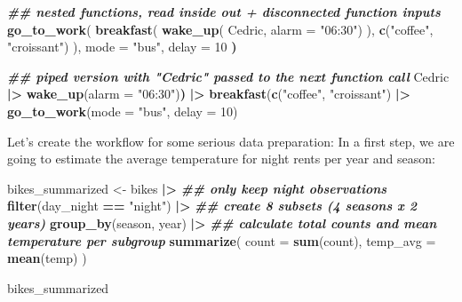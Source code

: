 \documentclass[
]{krantz}
\makeatletter
\newenvironment{Shaded}{\begin{snugshade}}{\end{snugshade}}
\newcommand{\AttributeTok}[1]{\textcolor[rgb]{0.27,0.27,0.27}{#1}}
\newcommand{\DecValTok}[1]{\textcolor[rgb]{0.06,0.06,0.06}{#1}}
\newcommand{\DocumentationTok}[1]{\textcolor[rgb]{0.37,0.37,0.37}{\textbf{\textit{#1}}}}
\newcommand{\ErrorTok}[1]{\textcolor[rgb]{0.14,0.14,0.14}{\textbf{#1}}}
\newcommand{\FunctionTok}[1]{\textcolor[rgb]{0.27,0.27,0.27}{\textbf{#1}}}
\newcommand{\NormalTok}[1]{#1}
\newcommand{\OtherTok}[1]{\textcolor[rgb]{0.37,0.37,0.37}{#1}}
\newcommand{\SpecialCharTok}[1]{\textcolor[rgb]{0.43,0.43,0.43}{\textbf{#1}}}
\newcommand{\StringTok}[1]{\textcolor[rgb]{0.5,0.5,0.5}{#1}}
\newenvironment{kframe}{%
\medskip{}
\setlength{\fboxsep}{.8em}
 \def\at@end@of@kframe{}%
 \ifinner\ifhmode%
  \def\at@end@of@kframe{\end{minipage}}%
  \begin{minipage}{\columnwidth}%
 \fi\fi%
 \def\FrameCommand##1{\hskip\@totalleftmargin \hskip-\fboxsep
 \colorbox{shadecolor}{##1}\hskip-\fboxsep
     \hskip-\linewidth \hskip-\@totalleftmargin \hskip\columnwidth}%
 \MakeFramed {\advance\hsize-\width
   \@totalleftmargin\z@ \linewidth\hsize
   \@setminipage}}%
 {\par\unskip\endMakeFramed%
 \at@end@of@kframe}
\renewenvironment{Shaded}{\begin{kframe}}{\end{kframe}}
\makeatother
\begin{document}
\begin{Shaded}
\begin{Highlighting}[]
\DocumentationTok{\#\# nested functions, read inside out + disconnected function inputs}
\FunctionTok{go\_to\_work}\NormalTok{(}
  \FunctionTok{breakfast}\NormalTok{(}
    \FunctionTok{wake\_up}\NormalTok{(}
\NormalTok{      Cedric, }\AttributeTok{alarm =} \StringTok{"06:30"}\NormalTok{)}
\NormalTok{    ), }
    \FunctionTok{c}\NormalTok{(}\StringTok{"coffee"}\NormalTok{, }\StringTok{"croissant"}\NormalTok{)}
\NormalTok{  ),}
\NormalTok{  mode }\OtherTok{=} \StringTok{"bus"}\NormalTok{, delay }\OtherTok{=} \DecValTok{10}
\ErrorTok{)}

\DocumentationTok{\#\# piped version with "Cedric" passed to the next function call}
\NormalTok{Cedric }\SpecialCharTok{|\textgreater{}} 
  \FunctionTok{wake\_up}\NormalTok{(}\AttributeTok{alarm =} \StringTok{"06:30"}\NormalTok{)}\ErrorTok{)} \SpecialCharTok{|\textgreater{}} 
  \FunctionTok{breakfast}\NormalTok{(}\FunctionTok{c}\NormalTok{(}\StringTok{"coffee"}\NormalTok{, }\StringTok{"croissant"}\NormalTok{) }\SpecialCharTok{|\textgreater{}} 
  \FunctionTok{go\_to\_work}\NormalTok{(}\AttributeTok{mode =} \StringTok{"bus"}\NormalTok{, }\AttributeTok{delay =} \DecValTok{10}\NormalTok{)}
\end{Highlighting}
\end{Shaded}

Let's create the workflow for some serious data preparation: In a first step, we are going to estimate the average temperature for night rents per year and season:

\begin{Shaded}
\begin{Highlighting}[]
\NormalTok{bikes\_summarized }\OtherTok{\textless{}{-}} 
\NormalTok{  bikes }\SpecialCharTok{|\textgreater{}} 
  \DocumentationTok{\#\# only keep night observations}
  \FunctionTok{filter}\NormalTok{(day\_night }\SpecialCharTok{==} \StringTok{"night"}\NormalTok{) }\SpecialCharTok{|\textgreater{}} 
  \DocumentationTok{\#\# create 8 subsets (4 seasons x 2 years)}
  \FunctionTok{group\_by}\NormalTok{(season, year) }\SpecialCharTok{|\textgreater{}} 
  \DocumentationTok{\#\# calculate total counts and mean temperature per subgroup}
  \FunctionTok{summarize}\NormalTok{(}
    \AttributeTok{count =} \FunctionTok{sum}\NormalTok{(count), }
    \AttributeTok{temp\_avg =} \FunctionTok{mean}\NormalTok{(temp)}
\NormalTok{  )}

\NormalTok{bikes\_summarized}
\end{Highlighting}
\end{Shaded}
\end{document}
